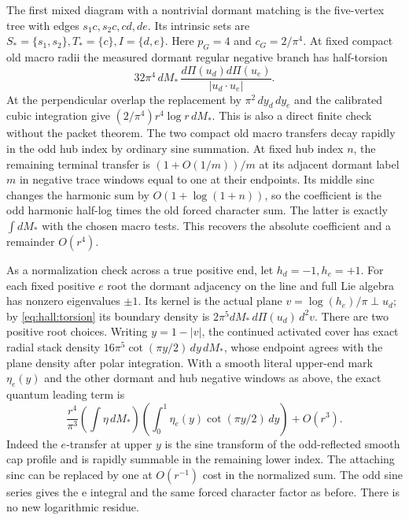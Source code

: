 The first mixed diagram with a nontrivial dormant matching is
the five-vertex tree with edges
\(s_1c,s_2c,cd,de\). Its intrinsic sets are
\(S_*=\{s_1,s_2\}, T_*=\{c\}, I=\{d,e\}\).
Here \(p_G=4\) and \(c_G=2/\pi^4\). At fixed compact old macro radii
the measured dormant regular negative branch has half-torsion
\[
    32\pi^4\,dM_*\,
       \frac{d\Pi(u_d)d\Pi(u_e)}{|u_d\cdot u_e|}.
\]
At the perpendicular overlap the replacement by \(\pi^2\,dy_d\,dy_e\)
and the calibrated cubic integration give
\((2/\pi^4)r^4\log r\,dM_*\).
This is also a direct finite check without the packet theorem.
The two compact old macro transfers decay rapidly in the odd hub
index by ordinary sine summation. At fixed hub index \(n\), the
remaining terminal transfer is
\((1+O(1/m))/m\) at its adjacent dormant label \(m\) in negative
trace windows equal to one at their endpoints. Its middle sinc
changes the harmonic sum by \(O(1+\log(1+n))\), so the coefficient
is the odd harmonic half-log times the old forced character
sum. The latter is exactly \(\int dM_*\) with the chosen macro
tests. This recovers the absolute coefficient and a remainder
\(O(r^4)\).

As a normalization check across a true positive end, let
\(h_d=-1,h_e=+1\). For each fixed positive \(e\) root the dormant
adjacency on the line and full Lie algebra has nonzero eigenvalues
\(\pm1\). Its kernel is the actual plane
\(v=\log(h_e)/\pi\perp u_d\); by
\eqref{eq:hall:torsion} its boundary density is
\(2\pi^5dM_*\,d\Pi(u_d)\,d^2v\).
There are two positive root choices. Writing \(y=1-|v|\), the
continued activated cover has exact radial stack density
\(16\pi^5\cot(\pi y/2)\,dy\,dM_*\), whose endpoint agrees with
the plane density after polar integration. With a smooth literal
upper-end mark \(\eta_e(y)\) and the other dormant and hub
negative windows as above, the exact quantum leading term is
\[
      \frac{r^4}{\pi^3}
           \left(\int\eta\,dM_*\right)
           \left(\int_0^1\eta_e(y)\cot(\pi y/2)\,dy\right)
      +O(r^3).
\]
Indeed the \(e\)-transfer at upper \(y\) is the sine transform of the
odd-reflected smooth cap profile and is rapidly summable in
the remaining lower index. The attaching sinc can be replaced by
one at \(O(r^{-1})\) cost in the normalized sum. The odd sine
series gives the e integral and the same forced character
factor as before. There is no new logarithmic residue.

